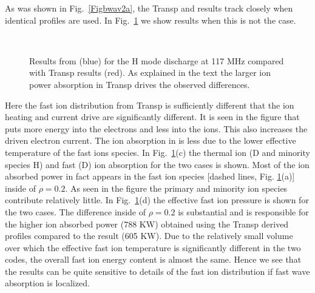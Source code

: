   As was shown in Fig.~\ref{Figbwav2a}, the Transp and \ot results track
   closely when identical profiles are used. In Fig.~\ref{Figbwav3b} we
   show results when this is not the case. 
 \begin{figure} %
 \centering 
\begin{narrow}{-.50in}{0in}   
 \mbox{}
\\[20pt]
 \mbox{}
\end{narrow}
 \caption{Results from \ot (blue) for the H mode discharge at 117 MHz compared with
   Transp results (red). As explained in the text the larger ion power absorption in Transp drives the observed differences.}
  \label{Figbwav3b}
 \end{figure}   
   Here the fast ion 
   distribution from Transp is sufficiently different that the ion
  heating and current drive are significantly different. It is seen in
  the figure that \ot puts more energy into the electrons and less into
  the ions. This also increases the driven electron current. The ion
  absorption in \ot is less due to the lower effective temperature of
  the fast ions species. In Fig.~\ref{Figbwav3b}(c) the thermal ion (D and
  minority species H) and fast (D)  ion absorption
  for the two cases is shown. Most of the ion absorbed power in fact
  appears in the fast ion species [dashed lines, Fig. \ref{Figbwav3b}(a)]
  inside of $\rho = 0.2$. As seen in the figure the primary and minority
  ion species contribute relatively little. In Fig.~\ref{Figbwav3b}(d) the
  effective fast ion pressure is shown for the two cases. The
  difference inside of $\rho =0.2$ is substantial and is responsible for
  the higher ion absorbed power (788 KW) obtained using the Transp
  derived profiles compared to the \ot result (605 KW). Due to the
  relatively small volume over which the effective fast ion
  temperature is significantly different in the two codes, the overall
  fast ion energy content is almost the same. Hence we see that the
  \ct results can be quite sensitive to details of the fast ion
  distribution if fast wave absorption is localized.   

